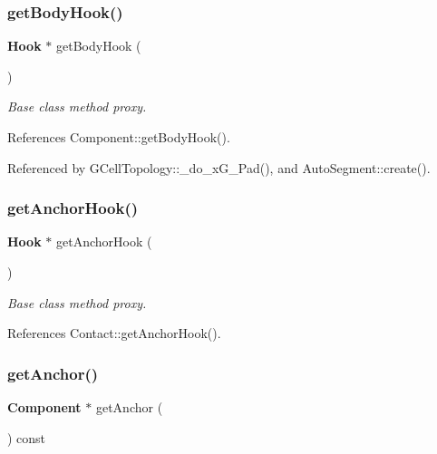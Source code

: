 \subsubsection{\texorpdfstring{get\+Body\+Hook()}{getBodyHook()}}
{\footnotesize\ttfamily \textbf{ Hook} $\ast$ get\+Body\+Hook (\begin{DoxyParamCaption}{ }\end{DoxyParamCaption})\hspace{0.3cm}{\ttfamily [inline]}}

{\itshape Base class method proxy.} 

References Component\+::get\+Body\+Hook().



Referenced by G\+Cell\+Topology\+::\+\_\+do\+\_\+x\+G\+\_\+Pad(), and Auto\+Segment\+::create().

\mbox{\label{classKatabatic_1_1AutoContact_ad4a1ca46647528c32c5fbd4c45ac866c}} 
\subsubsection{\texorpdfstring{get\+Anchor\+Hook()}{getAnchorHook()}}
{\footnotesize\ttfamily \textbf{ Hook} $\ast$ get\+Anchor\+Hook (\begin{DoxyParamCaption}{ }\end{DoxyParamCaption})\hspace{0.3cm}{\ttfamily [inline]}}

{\itshape Base class method proxy.} 

References Contact\+::get\+Anchor\+Hook().

\mbox{\label{classKatabatic_1_1AutoContact_a142af2208e8c058c672bbad3640a6c46}} 
\subsubsection{\texorpdfstring{get\+Anchor()}{getAnchor()}}
{\footnotesize\ttfamily \textbf{ Component} $\ast$ get\+Anchor (\begin{DoxyParamCaption}{ }\end{DoxyParamCaption}) const\hspace{0.3cm}{\ttfamily [inline]}}

